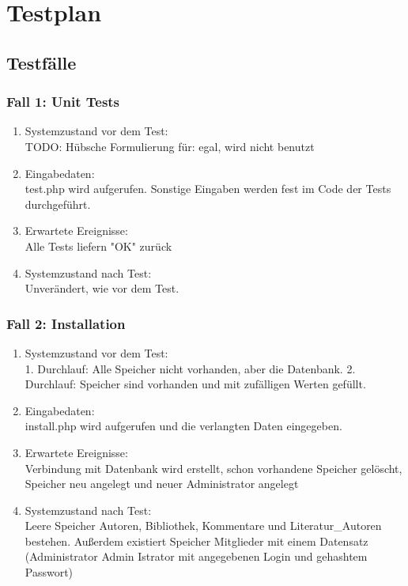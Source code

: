 \section{Testplan}
\subsection{Testfälle}

\subsubsection{Fall 1: Unit Tests}
\begin{enumerate}
\item Systemzustand vor dem Test:\\
	TODO: Hübsche Formulierung für: egal, wird nicht benutzt
\item Eingabedaten:\\
	test.php wird aufgerufen. Sonstige Eingaben werden fest im Code der Tests durchgeführt.
\item Erwartete Ereignisse:\\
	Alle Tests liefern "OK" zurück
\item Systemzustand nach Test:\\
	Unverändert, wie vor dem Test.
\end{enumerate}

\subsubsection{Fall 2: Installation}
\begin{enumerate}
\item Systemzustand vor dem Test:\\
	1. Durchlauf: Alle Speicher nicht vorhanden, aber die Datenbank. 2. Durchlauf: Speicher sind vorhanden und mit zufälligen Werten gefüllt.
\item Eingabedaten:\\
	install.php wird aufgerufen und die verlangten Daten eingegeben.
\item Erwartete Ereignisse:\\
	Verbindung mit Datenbank wird erstellt, schon vorhandene Speicher gelöscht, Speicher neu angelegt und neuer Administrator angelegt
\item Systemzustand nach Test:\\
	Leere Speicher Autoren, Bibliothek, Kommentare und Literatur\_Autoren bestehen. Außerdem existiert Speicher Mitglieder mit einem Datensatz (Administrator Admin Istrator mit angegebenen Login und gehashtem Passwort)
\end{enumerate}

